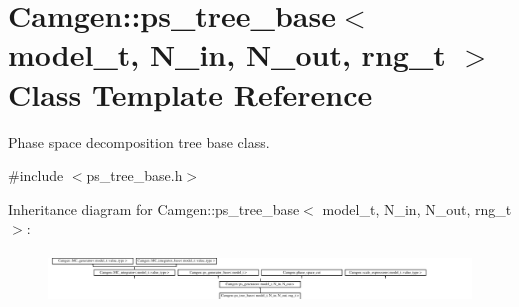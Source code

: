 \hypertarget{a00458}{}\section{Camgen\+:\+:ps\+\_\+tree\+\_\+base$<$ model\+\_\+t, N\+\_\+in, N\+\_\+out, rng\+\_\+t $>$ Class Template Reference}
\label{a00458}


Phase space decomposition tree base class.  




{\ttfamily \#include $<$ps\+\_\+tree\+\_\+base.\+h$>$}

Inheritance diagram for Camgen\+:\+:ps\+\_\+tree\+\_\+base$<$ model\+\_\+t, N\+\_\+in, N\+\_\+out, rng\+\_\+t $>$\+:\begin{figure}[H]
\begin{center}
\leavevmode
\includegraphics[height=1.357576cm]{a00458}
\end{center}
\end{figure}
